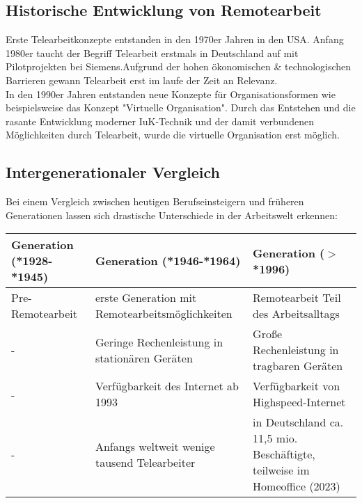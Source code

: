 \documentclass[runningheads]{llncs}
\begin{document}
\subsection{Historische Entwicklung von Remotearbeit}
Erste Telearbeitkonzepte entstanden in den 1970er Jahren in den USA\cite{Dangelmaier.1999}. Anfang 1980er taucht der Begriff Telearbeit erstmals in Deutschland auf mit Pilot\-projekten bei Siemens\cite{Dangelmaier.1999}.Aufgrund der hohen ökonomischen \& technologischen Barrieren gewann Telearbeit erst im laufe der Zeit an Relevanz\cite{Dangelmaier.1999}.\\
In den 1990er Jahren entstanden neue Konzepte für Organisationsformen wie beispielsweise das Konzept "Virtuelle Organisation"\cite{Siedenbiedel.2020}. Durch das Entstehen und die rasante Entwicklung moderner IuK-Technik und der damit verbundenen Möglichkeiten durch Telearbeit, wurde die virtuelle Organisation erst möglich\cite{Siedenbiedel.2020}.

\subsection{Intergenerationaler Vergleich}
Bei einem Vergleich zwischen heutigen Berufseinsteigern und früheren Generationen lassen sich drastische Unterschiede in der Arbeitswelt erkennen:
\vspace{-\baselineskip}
\begin{center}
\begin{tabular}{ | m{13em} | m{13em}| m{13em} | } 
\hline
Generation (*1928-*1945) & Generation (*1946-*1964) & Generation ($>$*1996) \\
\hline
Pre-Remotearbeit & erste Generation mit Remotearbeitsmöglichkeiten & Remotearbeit Teil des Arbeits\-alltags\\
\hline
- & Geringe Rechenleistung in stationären Geräten & Große Rechenleistung in tragbaren Geräten\\
\hline
- & Verfügbarkeit des Internet ab 1993\cite{CERN} & Verfügbarkeit von Highspeed-Internet\\
\hline
- & Anfangs weltweit wenige tausend Telearbeiter\cite{heilmann1983softwareentwicklung} & in Deutschland ca. 11,5 mio. Beschäftigte, teilweise im Homeoffice (2023)\cite{statis24, ifo23}\\
\hline
\end{tabular}
\end{center}

\end{document}
